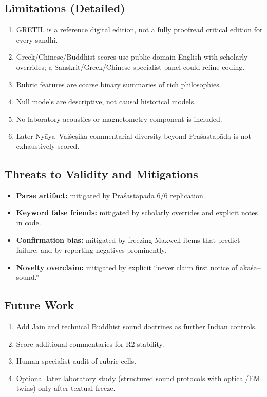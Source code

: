 \documentclass[12pt]{article}
\newcommand{\Vais}{Vaiśeṣika}
\newcommand{\akasa}{ākāśa}
\newcommand{\Pras}{Praśastapāda}
\begin{document}
\subsection{Limitations (Detailed)}
\begin{enumerate}
\item GRETIL is a reference digital edition, not a fully proofread critical edition for every sandhi.
\item Greek/Chinese/Buddhist scores use public-domain English with scholarly overrides; a Sanskrit/Greek/Chinese specialist panel could refine coding.
\item Rubric features are coarse binary summaries of rich philosophies.
\item Null models are descriptive, not causal historical models.
\item No laboratory acoustics or magnetometry component is included.
\item Later Nyāya--\Vais{} commentarial diversity beyond \Pras{} is not exhaustively scored.
\end{enumerate}

\subsection{Threats to Validity and Mitigations}
\begin{itemize}
\item \textbf{Parse artifact:} mitigated by \Pras{} 6/6 replication.
\item \textbf{Keyword false friends:} mitigated by scholarly overrides and explicit notes in code.
\item \textbf{Confirmation bias:} mitigated by freezing Maxwell items that predict failure, and by reporting negatives prominently.
\item \textbf{Novelty overclaim:} mitigated by explicit ``never claim first notice of \akasa{}--sound.''
\end{itemize}

\subsection{Future Work}
\begin{enumerate}
\item Add Jain and technical Buddhist sound doctrines as further Indian controls.
\item Score additional commentaries for R2 stability.
\item Human specialist audit of rubric cells.
\item Optional later laboratory study (structured sound protocols with optical/EM twins) only after textual freeze.
\end{enumerate}
\end{document}
